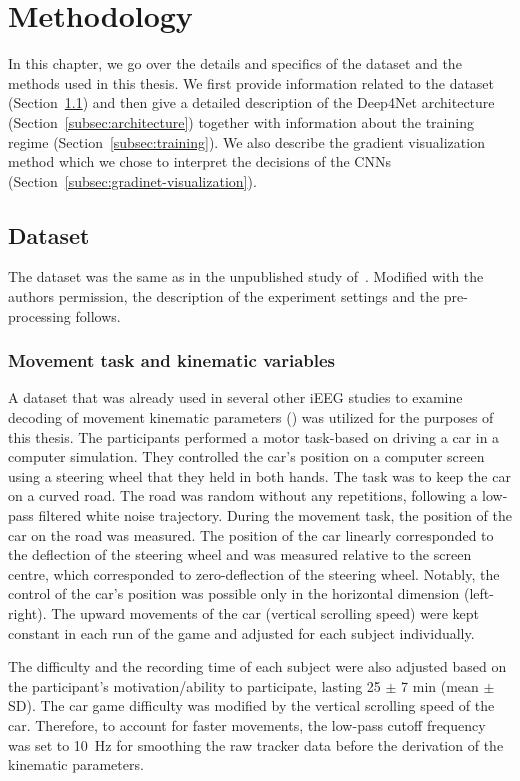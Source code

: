 \chapter{Methodology}\label{ch:methodology}
In this chapter, we go over the details and specifics of the dataset and the methods used in this thesis.
We first provide information related to the dataset (Section~\ref{sec:dataset}) and then give a detailed description of the Deep4Net architecture (Section~\ref{subsec:architecture}) together with information about the training regime (Section~\ref{subsec:training}).
We also describe the gradient visualization method which we chose to interpret the decisions of the CNNs (Section~\ref{subsec:gradinet-visualization}).

\section{Dataset}\label{sec:dataset}
The dataset was the same as in the unpublished study of~\cite{Hammer-2021}.
Modified with the authors permission, the description of the experiment settings and the pre-processing follows.

\subsection{Movement task and kinematic variables}\label{subsec:movement-task-and-kinematic-variables}
A dataset that was already used in several other iEEG studies to examine decoding of movement kinematic parameters (\cite{Hammer-2021,hammer-predominance-2016,hammer-role-2013}) was utilized for the purposes of this thesis.
The participants performed a motor task-based on driving a car in a computer simulation.
They controlled the car's position on a computer screen using a steering wheel that they held in both hands.
The task was to keep the car on a curved road.
The road was random without any repetitions, following a low-pass filtered white noise trajectory.
During the movement task, the position of the car on the road was measured.
The position of the car linearly corresponded to the deflection of the steering wheel and was measured relative to the screen centre, which corresponded to zero-deflection of the steering wheel.
Notably, the control of the car's position was possible only in the horizontal dimension (left-right).
The upward movements of the car (vertical scrolling speed) were kept constant in each run of the game and adjusted for each subject individually.

The difficulty and the recording time of each subject were also adjusted based on the participant's motivation/ability to participate, lasting 25 $\pm$ 7 min (mean $\pm$ SD).
The car game difficulty was modified by the vertical scrolling speed of the car.
Therefore, to account for faster movements, the low-pass cutoff frequency was set to 10~Hz for smoothing the raw tracker data before the derivation of the kinematic parameters.

